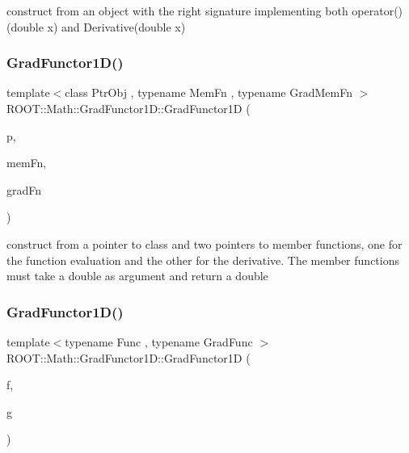 construct from an object with the right signature implementing both operator() (double x) and Derivative(double x) \mbox{\label{classROOT_1_1Math_1_1GradFunctor1D_a651aeef91a3d1a3ae323969d7239ebb2}} 
\subsubsection{\texorpdfstring{GradFunctor1D()}{GradFunctor1D()}\hspace{0.1cm}{\footnotesize\ttfamily [13/15]}}
{\footnotesize\ttfamily template$<$class Ptr\+Obj , typename Mem\+Fn , typename Grad\+Mem\+Fn $>$ \\
R\+O\+O\+T\+::\+Math\+::\+Grad\+Functor1\+D\+::\+Grad\+Functor1D (\begin{DoxyParamCaption}\item[{const Ptr\+Obj \&}]{p,  }\item[{Mem\+Fn}]{mem\+Fn,  }\item[{Grad\+Mem\+Fn}]{grad\+Fn }\end{DoxyParamCaption})\hspace{0.3cm}{\ttfamily [inline]}}

construct from a pointer to class and two pointers to member functions, one for the function evaluation and the other for the derivative. The member functions must take a double as argument and return a double \mbox{\label{classROOT_1_1Math_1_1GradFunctor1D_a30baab2a961d896e4aab6e60ed30d260}} 
\subsubsection{\texorpdfstring{GradFunctor1D()}{GradFunctor1D()}\hspace{0.1cm}{\footnotesize\ttfamily [14/15]}}
{\footnotesize\ttfamily template$<$typename Func , typename Grad\+Func $>$ \\
R\+O\+O\+T\+::\+Math\+::\+Grad\+Functor1\+D\+::\+Grad\+Functor1D (\begin{DoxyParamCaption}\item[{const Func \&}]{f,  }\item[{const Grad\+Func \&}]{g }\end{DoxyParamCaption})\hspace{0.3cm}{\ttfamily [inline]}}

